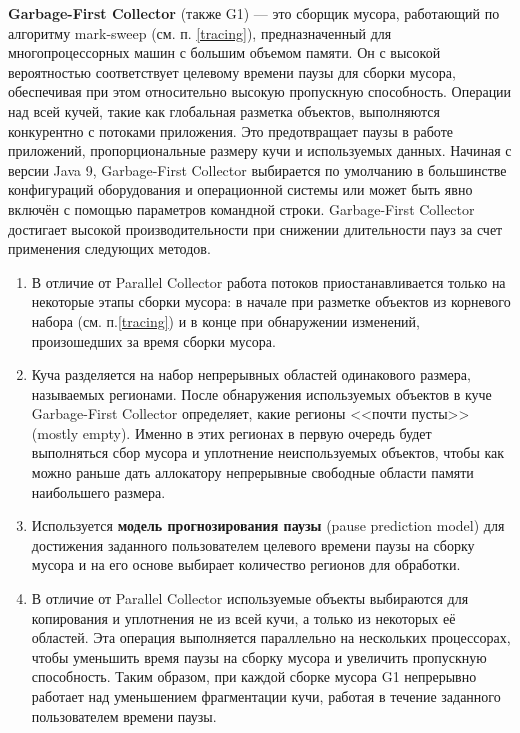\textbf{Garbage-First Collector} (также G1) --- это сборщик мусора, работающий по алгоритму mark-sweep (см. п. \ref{tracing}), предназначенный для многопроцессорных машин с большим объемом памяти. Он с высокой вероятностью соответствует целевому времени паузы для сборки мусора, обеспечивая при этом относительно высокую пропускную способность. Операции над всей кучей, такие как глобальная разметка объектов, выполняются конкурентно с потоками приложения. Это предотвращает паузы в работе приложений, пропорциональные размеру кучи и используемых данных. Начиная с версии Java 9, Garbage-First Collector выбирается по умолчанию в большинстве конфигураций оборудования и операционной системы или может быть явно включён с помощью параметров командной строки. Garbage-First Collector достигает высокой производительности при снижении длительности пауз за счет применения следующих методов.~\cite{java_g1}

\begin{enumerate}[label*=\arabic*.]
	\item В отличие от Parallel Collector работа потоков приостанавливается только на некоторые этапы сборки мусора: в начале при разметке объектов из корневого набора (см. п.\ref{tracing}) и в конце при обнаружении изменений, произошедших за время сборки мусора.~\cite{java_jrockit_memory} %
	\item Куча разделяется на набор непрерывных областей одинакового размера, называемых регионами. После обнаружения используемых объектов в куче Garbage-First Collector определяет, какие регионы <<почти пусты>> (mostly empty). Именно в этих регионах в первую очередь будет выполняться сбор мусора и уплотнение неиспользуемых объектов, чтобы как можно раньше дать аллокатору непрерывные свободные области памяти наибольшего размера.
	\item Используется \textbf{модель прогнозирования паузы} (pause prediction model) для достижения заданного пользователем целевого времени паузы на сборку мусора и на его основе выбирает количество регионов для обработки.
	\item В отличие от Parallel Collector используемые объекты выбираются для копирования и уплотнения не из всей кучи, а только из некоторых её областей. Эта операция выполняется параллельно на нескольких процессорах, чтобы уменьшить время паузы на сборку мусора и увеличить пропускную способность. Таким образом, при каждой сборке мусора G1 непрерывно работает над уменьшением фрагментации кучи, работая в течение заданного пользователем времени паузы.
\end{enumerate}

